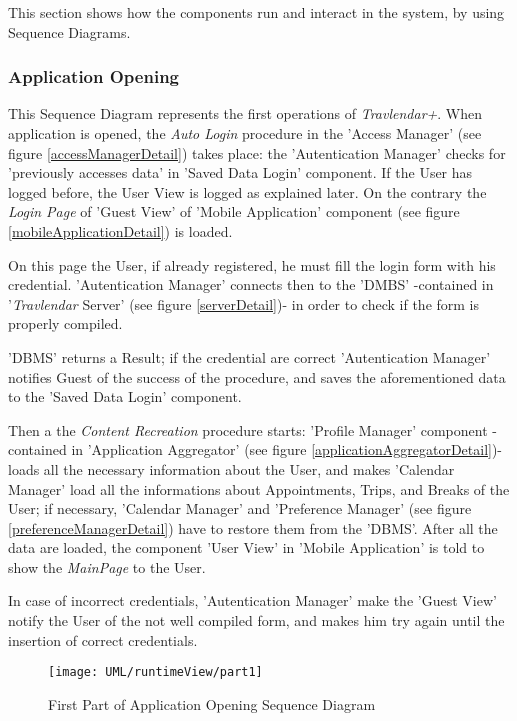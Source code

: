 This section shows how the components run and interact in the system, by using Sequence Diagrams.

\subsubsection{Application Opening}

	This Sequence Diagram represents the first operations of \textit{Travlendar+}.
	When application is opened, the \textsl{Auto Login} procedure in the 'Access Manager' (see figure \ref{accessManagerDetail}) takes place: the 'Autentication Manager' checks for 'previously accesses data' in 'Saved Data Login' component. If the User has logged before, the User View is logged as explained later.
	On the contrary the \textsl{Login Page} of 'Guest View' of 'Mobile Application' component  (see figure \ref{mobileApplicationDetail}) is loaded.
	
	On this page the User, if already registered, he must fill the login form with his credential.
	'Autentication Manager' connects then to the 'DMBS' -contained in '\textit{Travlendar} Server' (see figure \ref{serverDetail})- in order to check if the form is properly compiled.
	
	'DBMS' returns a Result; if the credential are correct 'Autentication Manager' notifies Guest of the success of the procedure, and saves the aforementioned data to the 'Saved Data Login' component.
	
	Then a the \textsl{Content Recreation} procedure starts:
	'Profile Manager' component -contained in 'Application Aggregator' (see figure \ref{applicationAggregatorDetail})- loads all the necessary information about the User, and makes 'Calendar Manager' load all the informations about Appointments, Trips, and Breaks of the User; if necessary, 'Calendar Manager' and 'Preference Manager' (see figure \ref{preferenceManagerDetail}) have to restore them from the 'DBMS'.
	After all the data are loaded, the component 'User View' in 'Mobile Application' is told to show the \textsl{MainPage} to the User.
	
	In case of incorrect credentials, 'Autentication Manager' make the 'Guest View' notify the User of the not well compiled form, and makes him try again until the insertion of correct credentials.
	
	\begin{figure}[H]
		\centering
		\texttt{[image: UML/runtimeView/part1]}
		\caption{First Part of Application Opening Sequence Diagram}
	\end{figure}
	
